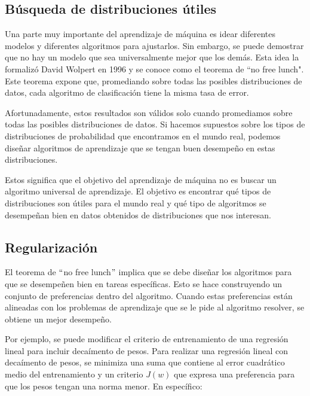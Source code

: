 \subsection{Búsqueda de distribuciones útiles}
Una parte muy importante del aprendizaje de máquina es idear diferentes modelos y diferentes algoritmos para ajustarlos. Sin embargo, se puede demostrar que no hay un modelo que sea universalmente mejor que los demás. Esta idea la formalizó David Wolpert en 1996 y se conoce como el teorema de ``no free lunch". Este teorema expone que, promediando sobre todas las posibles distribuciones de datos, cada algoritmo de clasificación tiene la misma tasa de error. 
\cite{Murphy:2012:MLP:2380985}
\cite{wolpert}

\vspace{1em}

Afortunadamente, estos resultados son válidos solo cuando promediamos sobre todas las posibles distribuciones de datos. Si hacemos supuestos sobre los tipos de distribuciones de probabilidad que encontramos en el mundo real, podemos diseñar algoritmos de aprendizaje que se tengan buen desempeño en estas distribuciones.

\vspace{1em}

Estos significa que el objetivo del aprendizaje de máquina no es buscar un algoritmo universal de aprendizaje. El objetivo es encontrar qué tipos de distribuciones son útiles para el mundo real y qué tipo de algoritmos se desempeñan bien en datos obtenidos de distribuciones que nos interesan.
\cite{goodfellow-et-al-2016}

\subsection{Regularización}
El teorema de $``$no free lunch$"$ implica que se debe diseñar los algoritmos para que se desempeñen bien en tareas específicas. Esto se hace construyendo un conjunto de preferencias dentro del algoritmo. Cuando estas preferencias están alineadas con los problemas de aprendizaje que se le pide al algoritmo resolver, se obtiene un mejor desempeño.
\cite{goodfellow-et-al-2016}

\vspace{1em}

Por ejemplo, se puede modificar el criterio de entrenamiento de una regresión lineal para incluir decaímento de pesos. Para realizar una regresión lineal con decaímento de pesos, se minimiza una suma que contiene al error cuadrático medio del entrenamiento y un criterio $J(w)$ que expresa una preferencia para que los pesos tengan una norma menor. En específico: 

